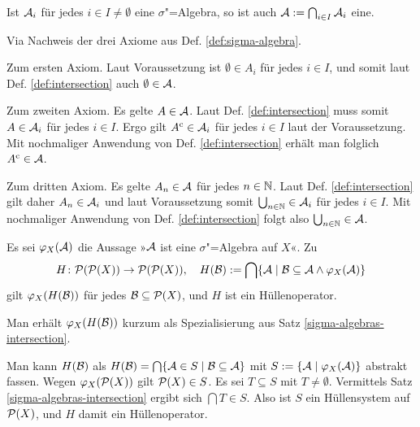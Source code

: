 \begin{Satz}\label{sigma-algebras-intersection}
Ist $\mathcal{A}_i$ für jedes $i\in I\ne\emptyset$ eine $\sigma$"=Algebra,
so ist auch $\mathcal{A} := \bigcap_{i\in I}\mathcal{A}_i$ eine.
\end{Satz}
\begin{Beweis}
Via Nachweis der drei Axiome aus Def. \ref{def:sigma-algebra}.

Zum ersten Axiom. Laut Voraussetzung ist $\emptyset\in A_i$ für jedes $i\in I$,
und somit laut Def. \ref{def:intersection} auch $\emptyset\in\mathcal{A}$.

Zum zweiten Axiom. Es gelte $A\in\mathcal{A}$. Laut Def.
\ref{def:intersection} muss somit $A\in\mathcal{A}_i$ für jedes $i\in I$.
Ergo gilt $A^\mathrm c\in\mathcal{A}_i$ für jedes $i\in I$ laut der
Voraussetzung. Mit nochmaliger Anwendung von Def. \ref{def:intersection}
erhält man folglich $A^\mathrm c\in\mathcal{A}$.

Zum dritten Axiom. Es gelte $A_n\in\mathcal{A}$ für jedes $n\in\mathbb N$.
Laut Def. \ref{def:intersection} gilt daher $A_n\in\mathcal{A}_i$
und laut Voraussetzung somit $\bigcup_{n\in\mathbb N}\in\mathcal{A}_i$ für
jedes $i\in I$. Mit nochmaliger Anwendung von Def. \ref{def:intersection}
folgt also $\bigcup_{n\in\mathbb N}\in\mathcal{A}$.\,\qedsymbol
\end{Beweis}

\begin{Satz}
Es sei $\varphi_X(\mathcal{A})$ die Aussage »$\mathcal{A}$ ist eine
$\sigma$"=Algebra auf $X$«. Zu
\[H\colon\mathcal P(\mathcal P(X))\to\mathcal P(\mathcal P(X)),\quad
H(\mathcal{B}) := \bigcap\{\mathcal{A}\mid
\mathcal{B}\subseteq\mathcal{A}\land\varphi_X(\mathcal{A})\}\]
gilt $\varphi_X(H(\mathcal{B}))$ für jedes $\mathcal{B}\subseteq\mathcal P(X)$,
und $H$ ist ein Hüllenoperator.
\end{Satz}
\begin{Beweis}
Man erhält $\varphi_X(H(\mathcal{B}))$ kurzum als Spezialisierung
aus Satz \ref{sigma-algebras-intersection}.

Man kann $H(\mathcal{B})$ als $H(\mathcal{B}) =
\bigcap\{\mathcal{A}\in S\mid\mathcal{B}\subseteq\mathcal{A}\}$
mit $S := \{\mathcal{A}\mid\varphi_X(\mathcal{A})\}$
abstrakt fassen. Wegen $\varphi_X(\mathcal{P}(X))$ gilt
$\mathcal{P}(X)\in S$. Es sei $T\subseteq S$ mit $T\ne\emptyset$.
Vermittels Satz \ref{sigma-algebras-intersection} ergibt sich
$\bigcap T\in S$. Also ist $S$ ein Hüllensystem auf $\mathcal P(X)$,
und $H$ damit ein Hüllenoperator.\,\qedsymbol
\end{Beweis}
